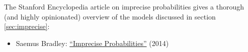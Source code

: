 The Stanford Encyclopedia article on imprecise probabilities gives a
thorough (and highly opinionated) overview of the models discussed in
section \ref{sec:imprecise}:

\begin{itemize}
\item Saemus Bradley: \href{https://plato.stanford.edu/entries/imprecise-probabilities/}{``Imprecise Probabilities''} (2014)
\end{itemize}



